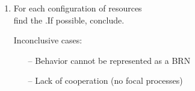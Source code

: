\begin{frame}
\begin{columns}
\begin{column}{0.2\textwidth}
\end{column}
\begin{column}{0.25\textwidth}


\end{column}
\end{columns}

\smallskip
\pause[2]
\begin{enumerate}[1.]
  \item For each configuration of resources \quad [\ex{$\omega = \{a^+, b^-\}$}]\\
\pause
        find the .\pause[4] If possible, conclude. \quad [$\ex{k_{z,\{a^+, b^-\}} = 1}$]
\pause[5]
 \item[] Inconclusive cases:
  \begin{itemize}
    \item[--] Behavior cannot be represented as a BRN
    \item[--] Lack of cooperation (no focal processes)
  \end{itemize}
\end{enumerate}
\end{frame}

